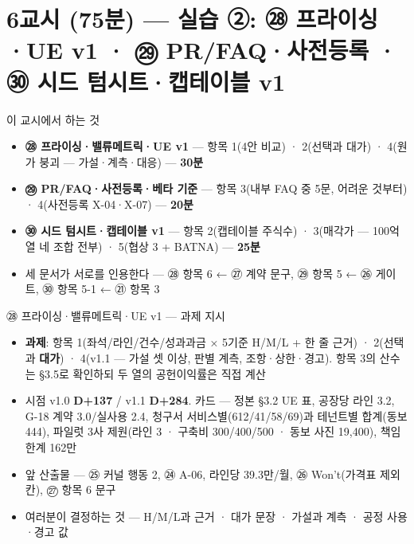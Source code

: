 \section{6교시 (75분) — 실습 ②: ㉘ 프라이싱·UE v1 · ㉙ PR/FAQ·사전등록 · ㉚ 시드 텀시트·캡테이블 v1}
\begin{frame}{이 교시에서 하는 것}
\begin{itemize}
\item \textbf{㉘ 프라이싱·밸류메트릭·UE v1} — 항목 1(4안 비교) · 2(선택과 대가) · 4(원가 붕괴 — 가설·계측·대응) — \textbf{30분}
\item \textbf{㉙ PR/FAQ·사전등록·베타 기준} — 항목 3(내부 FAQ 중 5문, 어려운 것부터) · 4(사전등록 X-04·X-07) — \textbf{20분}
\item \textbf{㉚ 시드 텀시트·캡테이블 v1} — 항목 2(캡테이블 주식수) · 3(매각가 — 100억 열 네 조합 전부) · 5(협상 3 + BATNA) — \textbf{25분}
\item 세 문서가 서로를 인용한다 — ㉘ 항목 6 ← ㉗ 계약 문구, ㉙ 항목 5 ← ㉖ 게이트, ㉚ 항목 5-1 ← ㉑ 항목 3
\end{itemize}
\end{frame}

\begin{frame}{㉘ 프라이싱·밸류메트릭·UE v1 — 과제 지시}
\begin{itemize}
\item \textbf{과제}: 항목 1(좌석/라인/건수/성과과금 × 5기준 H/M/L + 한 줄 근거) · 2(선택과 \textbf{대가}) · 4(v1.1 — 가설 셋 이상, 판별 계측, 조항·상한·경고). 항목 3의 산수는 §3.5로 확인하되 두 열의 공헌이익률은 직접 계산
\item 시점 v1.0 \textbf{D+137} / v1.1 \textbf{D+284}. 카드 — 정본 §3.2 UE 표, 공장당 라인 3.2, G-18 계약 3.0/실사용 2.4, 청구서 서비스별(612/41/58/69)과 테넌트별 합계(동보 444), 파일럿 3사 제원(라인 3 · 구축비 300/400/500 · 동보 사진 19,400), 책임 한계 162만
\item 앞 산출물 — ㉕ 커널 행동 2, ㉔ A-06, 라인당 39.3만/월, ㉖ Won't(가격표 제외 칸), ㉗ 항목 6 문구
\item 여러분이 결정하는 것 — H/M/L과 근거 · 대가 문장 · 가설과 계측 · 공정 사용·경고 값
\end{itemize}
\end{frame}

